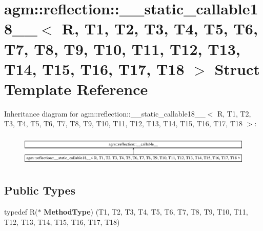\hypertarget{structagm_1_1reflection_1_1____static__callable18____}{}\section{agm\+:\+:reflection\+:\+:\+\_\+\+\_\+static\+\_\+callable18\+\_\+\+\_\+$<$ R, T1, T2, T3, T4, T5, T6, T7, T8, T9, T10, T11, T12, T13, T14, T15, T16, T17, T18 $>$ Struct Template Reference}
\label{structagm_1_1reflection_1_1____static__callable18____}
Inheritance diagram for agm\+:\+:reflection\+:\+:\+\_\+\+\_\+static\+\_\+callable18\+\_\+\+\_\+$<$ R, T1, T2, T3, T4, T5, T6, T7, T8, T9, T10, T11, T12, T13, T14, T15, T16, T17, T18 $>$\+:\begin{figure}[H]
\begin{center}
\leavevmode
\includegraphics[height=1.515562cm]{structagm_1_1reflection_1_1____static__callable18____}
\end{center}
\end{figure}
\subsection*{Public Types}
\begin{DoxyCompactItemize}
\item 
typedef R($\ast$ {\bfseries Method\+Type}) (T1, T2, T3, T4, T5, T6, T7, T8, T9, T10, T11, T12, T13, T14, T15, T16, T17, T18)\hypertarget{structagm_1_1reflection_1_1____static__callable18_____a933674b0097c9479bd2882d1e03014c3}{}\label{structagm_1_1reflection_1_1____static__callable18_____a933674b0097c9479bd2882d1e03014c3}

\end{DoxyCompactItemize}
